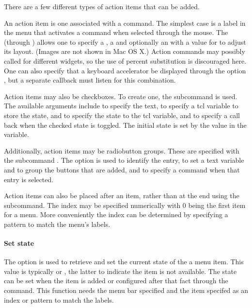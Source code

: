 There are a few different types of action items that can be added.
 

An action item is one associated with a command. The simplest case is
a label in the menu that activates a command when selected through the
mouse. The  (through
) allows one to specify a
, a  and optionally an  with a
value for  to adjust its layout. (Images are not shown
in Mac OS X.) Action commands may possibly called for different
widgets, so the use of percent substitution is discouraged here. One can also specify that a keyboard accelerator be displayed through the option , but a separate callback must listen for this combination.

Action items may also be checkboxes. To create one, the subcommand
 is used. The available
arguments include  to specify the text,  to
specify a tcl variable to store the state,  and
 to specify the state to the tcl variable, and
 to specify a call back when the checked state is
toggled. The initial state is set by the value in the  \TCL\/ variable.

Additionally, action items may be radiobutton groups. These are
specified with the subcommand . The  option is used to identify
the entry,  to set a text variable and to group the
buttons that are added, and  to specify a command when
that entry is selected.

Action items can also be placed after an item, rather than at the end
using the  subcommand. The
index may be specified numerically with 0 being the first item for a
menu.  More conveniently the index can be determined by specifying a
pattern to match the menu's labels.


\paragraph{Set state}
The  option is used to retrieve and set the current state of the a menu item.
This value is typically  or
, the latter to indicate the item is not available. The
state can be set when the item is added or configured after that fact
through the  command. This function
needs the menu bar specified and the item specifed as an index or
pattern to match the labels.

